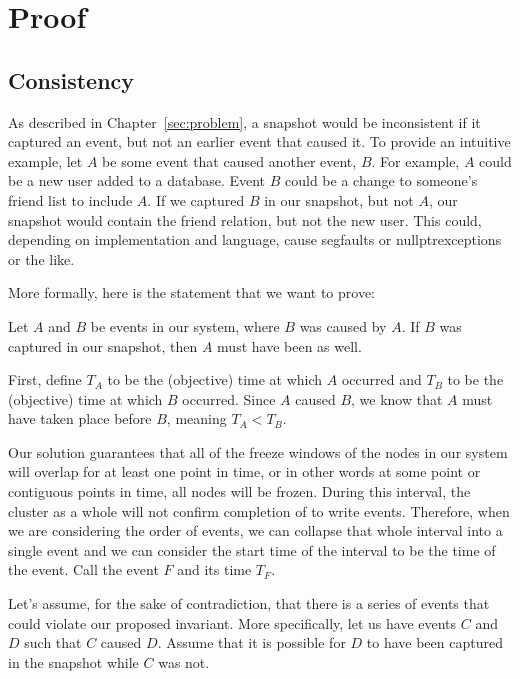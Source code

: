 \chapter{Proof}
\label{sec:proof}


\section{Consistency}

As described in Chapter~\ref{sec:problem}, a snapshot would be
inconsistent if it captured an event, but not an earlier event that
caused it. To provide an intuitive example, let $A$ be some event that
caused another event, $B$.  For example, $A$ could be a new user added
to a database. Event $B$ could be a change to someone's friend list to
include $A$. If we captured $B$ in our snapshot, but not $A$, our
snapshot would contain the friend relation, but not the new user. This
could, depending on implementation and language, cause segfaults or
nullptrexceptions or the like.

More formally, here is the statement that we want to prove:

Let $A$ and $B$ be events in our system, where $B$ was caused by
$A$. If $B$ was captured in our snapshot, then $A$ must have been as
well.

First, define $T_A$ to be the (objective) time at which $A$ occurred
and $T_B$ to be the (objective) time at which $B$ occurred. Since $A$
caused $B$, we know that $A$ must have taken place before $B$, meaning
$T_A < T_B$.

Our solution guarantees that all of the freeze windows of the nodes in
our system will overlap for at least one point in time, or in other
words at some point or contiguous points in time, all nodes will be
frozen.  During this interval, the cluster as a whole will not confirm
completion of to write events. Therefore, when we are considering the
order of events, we can collapse that whole interval into a single
event and we can consider the start time of the interval to be the
time of the event. Call the event $F$ and its time $T_F$.

Let's assume, for the sake of contradiction, that there is a series of
events that could violate our proposed invariant. More specifically,
let us have events $C$ and $D$ such that $C$ caused $D$. Assume that
it is possible for $D$ to have been captured in the snapshot while $C$
was not.

